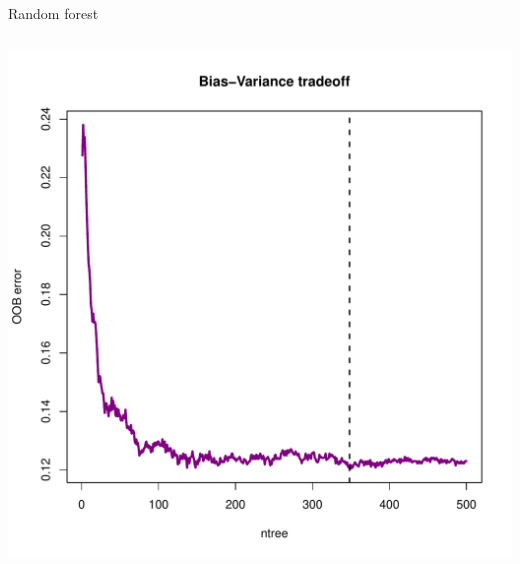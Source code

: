 \begin{frame}[fragile]{Random forest}
\begin{columns}[T]
\begin{column}{0.45\textwidth}
\hspace*{-0.8em}\includegraphics[width=1.1\columnwidth]{../r-StatsLearn-Exam/src/plots/biasvar-rf-apple}

\end{column}
\end{columns}

\end{frame}


